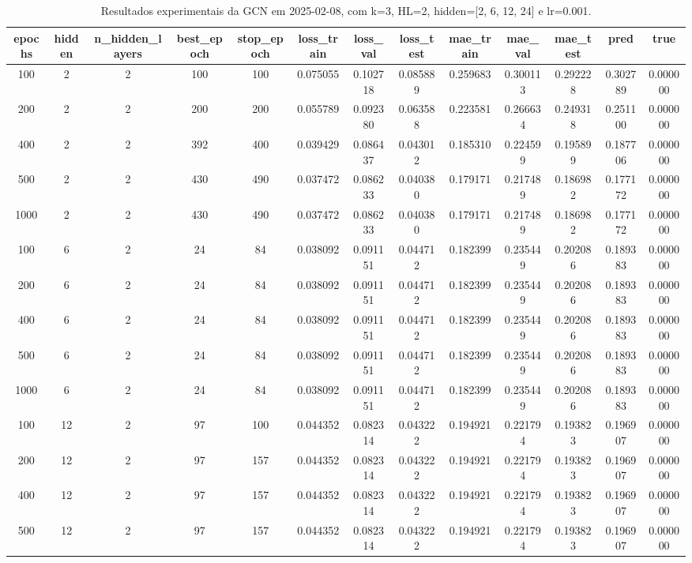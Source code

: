 \begin{table}[h]
\centering
\caption{Resultados experimentais da GCN em 2025-02-08, com k=3, HL=2, hidden=[2, 6, 12, 24] e lr=0.001.}
\label{tab:gcn_results_k3_hl2_d20250208}
\begin{tabular}{ccccccccccccc}
\toprule
epochs & hidden & n\_hidden\_layers & best\_epoch & stop\_epoch & loss\_train & loss\_val & loss\_test & mae\_train & mae\_val & mae\_test & pred & true \\
\midrule
100 & 2 & 2 & 100 & 100 & 0.075055 & 0.102718 & 0.085889 & 0.259683 & 0.300113 & 0.292228 & 0.302789 & 0.000000 \\
200 & 2 & 2 & 200 & 200 & 0.055789 & 0.092380 & 0.063588 & 0.223581 & 0.266634 & 0.249318 & 0.251100 & 0.000000 \\
400 & 2 & 2 & 392 & 400 & 0.039429 & 0.086437 & 0.043012 & 0.185310 & 0.224599 & 0.195899 & 0.187706 & 0.000000 \\
500 & 2 & 2 & 430 & 490 & 0.037472 & 0.086233 & 0.040380 & 0.179171 & 0.217489 & 0.186982 & 0.177172 & 0.000000 \\
1000 & 2 & 2 & 430 & 490 & 0.037472 & 0.086233 & 0.040380 & 0.179171 & 0.217489 & 0.186982 & 0.177172 & 0.000000 \\
100 & 6 & 2 & 24 & 84 & 0.038092 & 0.091151 & 0.044712 & 0.182399 & 0.235449 & 0.202086 & 0.189383 & 0.000000 \\
200 & 6 & 2 & 24 & 84 & 0.038092 & 0.091151 & 0.044712 & 0.182399 & 0.235449 & 0.202086 & 0.189383 & 0.000000 \\
400 & 6 & 2 & 24 & 84 & 0.038092 & 0.091151 & 0.044712 & 0.182399 & 0.235449 & 0.202086 & 0.189383 & 0.000000 \\
500 & 6 & 2 & 24 & 84 & 0.038092 & 0.091151 & 0.044712 & 0.182399 & 0.235449 & 0.202086 & 0.189383 & 0.000000 \\
1000 & 6 & 2 & 24 & 84 & 0.038092 & 0.091151 & 0.044712 & 0.182399 & 0.235449 & 0.202086 & 0.189383 & 0.000000 \\
100 & 12 & 2 & 97 & 100 & 0.044352 & 0.082314 & 0.043222 & 0.194921 & 0.221794 & 0.193823 & 0.196907 & 0.000000 \\
200 & 12 & 2 & 97 & 157 & 0.044352 & 0.082314 & 0.043222 & 0.194921 & 0.221794 & 0.193823 & 0.196907 & 0.000000 \\
400 & 12 & 2 & 97 & 157 & 0.044352 & 0.082314 & 0.043222 & 0.194921 & 0.221794 & 0.193823 & 0.196907 & 0.000000 \\
500 & 12 & 2 & 97 & 157 & 0.044352 & 0.082314 & 0.043222 & 0.194921 & 0.221794 & 0.193823 & 0.196907 & 0.000000 \\

\end{tabular}
\end{table}
